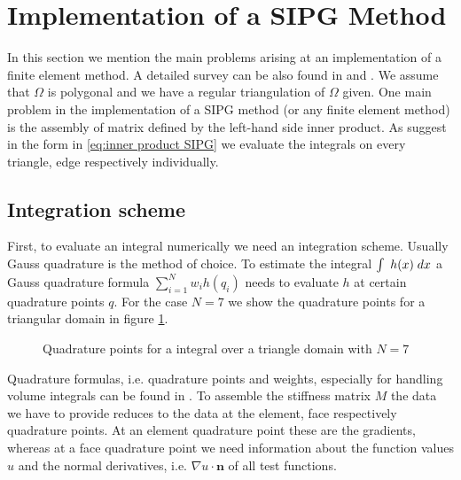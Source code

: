 \section{Implementation of a SIPG Method}

In this section we mention the main problems arising at an implementation of a finite element method. A detailed survey can be also found in \cite[Section 0.6]{BS2002} and \cite[Chapter 8]{Braess2003}.
We assume that $\Omega$ is polygonal and we have a regular triangulation of $\Omega$ given. One main problem in the implementation of a SIPG method (or any finite element method) is the assembly of matrix defined by the left-hand side inner product. As suggest in the form in \eqref{eq:inner product SIPG} we evaluate the integrals on every triangle, edge respectively individually.

\subsection{Integration scheme}
First, to evaluate an integral numerically we need an integration scheme. Usually Gauss quadrature is the method of choice. To estimate the integral $\int_{\phantom{x}} {{h(x)}\;dx} $ a Gauss quadrature formula $\sum_{i=1}^{N} w_i h(q_i)$ needs to evaluate $h$ at certain quadrature points $q$. For the case $N=7$ we show the quadrature points for a triangular domain in figure \ref{fig: quadrature}.
\begin{figure}[!h]
	\centering
	
	\caption{Quadrature points for a integral over a triangle domain with $N=7$}
	 \label{fig: quadrature}
\end{figure}
Quadrature formulas, i.e. quadrature points and weights, especially for handling volume integrals can be found in \cite{Strout1971}.
To assemble the stiffness matrix $M$ the data we have to provide reduces to the data at the element, face respectively quadrature points.  
At an element quadrature point these are the gradients, whereas at a face quadrature point we need information about  the function values $u$ and the normal derivatives, i.e. $\nabla u \cdot \mathbf{n}$ of all test functions.


